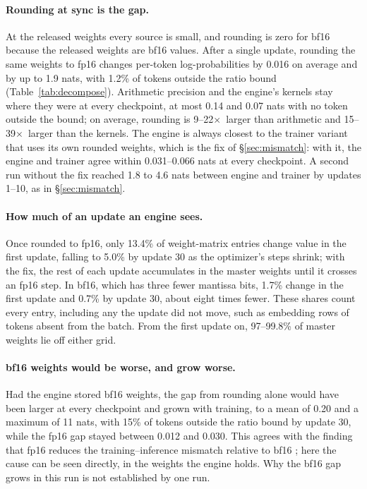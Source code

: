 \documentclass[11pt]{article}
\newcommand{\x}{$\times$}
\begin{document}
\paragraph{Rounding at sync is the gap.} At the released weights every source is small, and
rounding is zero for bf16 because the released weights are bf16 values. After a single update,
rounding the same weights to fp16 changes per-token log-probabilities by 0.016 on average and by up
to 1.9 nats, with 1.2\% of tokens outside the ratio bound (Table~\ref{tab:decompose}). Arithmetic
precision and the engine's kernels stay where they were at every checkpoint, at most 0.14 and 0.07
nats with no token outside the bound; on average, rounding is 9--22\x\ larger than arithmetic and
15--39\x\ larger than the kernels. The engine is always closest to the trainer variant that uses
its own rounded weights, which is the fix of \S\ref{sec:mismatch}: with it, the engine and trainer
agree within 0.031--0.066 nats at every checkpoint. A second run without the fix reached 1.8 to
4.6 nats between engine and trainer by updates 1--10, as in \S\ref{sec:mismatch}.

\paragraph{How much of an update an engine sees.} Once rounded to fp16, only 13.4\% of
weight-matrix entries change value in the first update, falling to 5.0\% by update 30 as the
optimizer's steps shrink; with the fix, the rest of each update accumulates in the master weights
until it crosses an fp16 step. In bf16, which has three fewer mantissa bits, 1.7\% change in the
first update and 0.7\% by update 30, about eight times fewer. These shares count every entry,
including any the update did not move, such as embedding rows of tokens absent from the batch. From
the first update on, 97--99.8\% of master weights lie off either grid.

\paragraph{bf16 weights would be worse, and grow worse.} Had the engine stored bf16 weights, the gap from
rounding alone would have been larger at every checkpoint and grown with training, to a mean of
0.20 and a maximum of 11 nats, with 15\% of tokens outside the ratio bound by update 30, while the
fp16 gap stayed between 0.012 and 0.030. This agrees with the finding that fp16 reduces the
training--inference mismatch relative to bf16 \citep{qi2025fp16}; here the cause can be seen
directly, in the weights the engine holds. Why the bf16 gap grows in this run is not established by
one run.
\end{document}
